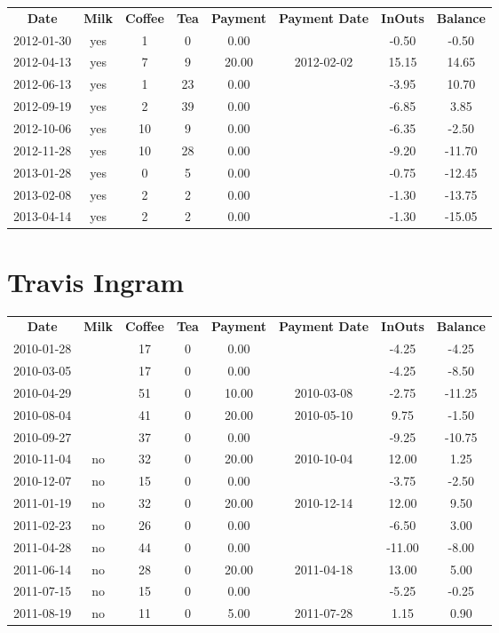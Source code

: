 \begin{center}
\begin{tabular}{cccccccc}
\textbf{Date} & \textbf{Milk} & \textbf{Coffee} & \textbf{Tea} & \textbf{Payment} & \textbf{Payment Date} & \textbf{InOuts} & \textbf{Balance} \\
2012-01-30 & yes &  1 &  0 &  0.00 &  & -0.50 &  -0.50\\ 
2012-04-13 & yes &  7 &  9 & 20.00 & 2012-02-02 & 15.15 &  14.65\\ 
2012-06-13 & yes &  1 & 23 &  0.00 &  & -3.95 &  10.70\\ 
2012-09-19 & yes &  2 & 39 &  0.00 &  & -6.85 &   3.85\\ 
2012-10-06 & yes & 10 &  9 &  0.00 &  & -6.35 &  -2.50\\ 
2012-11-28 & yes & 10 & 28 &  0.00 &  & -9.20 & -11.70\\ 
2013-01-28 & yes &  0 &  5 &  0.00 &  & -0.75 & -12.45\\ 
2013-02-08 & yes &  2 &  2 &  0.00 &  & -1.30 & -13.75\\ 
2013-04-14 & yes &  2 &  2 &  0.00 &  & -1.30 & -15.05
\end{tabular}
\end{center}

\section{Travis Ingram}

\begin{center}
\begin{tabular}{cccccccc}
\textbf{Date} & \textbf{Milk} & \textbf{Coffee} & \textbf{Tea} & \textbf{Payment} & \textbf{Payment Date} & \textbf{InOuts} & \textbf{Balance} \\
2010-01-28 &  & 17 & 0 &  0.00 &  &  -4.25 &  -4.25\\ 
2010-03-05 &  & 17 & 0 &  0.00 &  &  -4.25 &  -8.50\\ 
2010-04-29 &  & 51 & 0 & 10.00 & 2010-03-08 &  -2.75 & -11.25\\ 
2010-08-04 &  & 41 & 0 & 20.00 & 2010-05-10 &   9.75 &  -1.50\\ 
2010-09-27 &  & 37 & 0 &  0.00 &  &  -9.25 & -10.75\\ 
2010-11-04 & no & 32 & 0 & 20.00 & 2010-10-04 &  12.00 &   1.25\\ 
2010-12-07 & no & 15 & 0 &  0.00 &  &  -3.75 &  -2.50\\ 
2011-01-19 & no & 32 & 0 & 20.00 & 2010-12-14 &  12.00 &   9.50\\ 
2011-02-23 & no & 26 & 0 &  0.00 &  &  -6.50 &   3.00\\ 
2011-04-28 & no & 44 & 0 &  0.00 &  & -11.00 &  -8.00\\ 
2011-06-14 & no & 28 & 0 & 20.00 & 2011-04-18 &  13.00 &   5.00\\ 
2011-07-15 & no & 15 & 0 &  0.00 &  &  -5.25 &  -0.25\\ 
2011-08-19 & no & 11 & 0 &  5.00 & 2011-07-28 &   1.15 &   0.90
\end{tabular}
\end{center}

